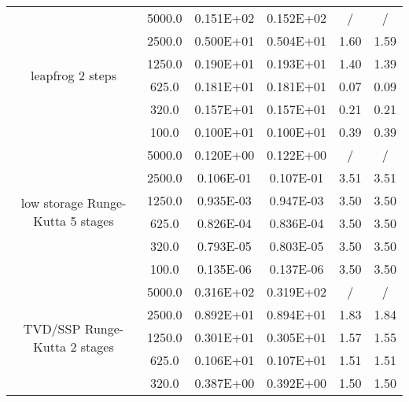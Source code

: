 \documentclass[pdftex,preprint,3p,times,numbers]{elsarticle}
\begin{document}
\begin{table}[!ht]
{\begin{tabular}{cccccc}
    \cmidrule{2-6}
    \multirow{6}{*}{leapfrog 2 steps}
                 &   5000.0        &  0.151E+02    &  0.152E+02    & /             & /             \\
                 &   2500.0        &  0.500E+01    &  0.504E+01    & 1.60          & 1.59          \\
                 &   1250.0        &  0.190E+01    &  0.193E+01    & 1.40          & 1.39          \\
                 &    625.0        &  0.181E+01    &  0.181E+01    & 0.07          & 0.09          \\
                 &    320.0        &  0.157E+01    &  0.157E+01    & 0.21          & 0.21          \\
                 &    100.0        &  0.100E+01    &  0.100E+01    & 0.39          & 0.39          \\
    \cmidrule{2-6}
    \multirow{6}{*}{low storage Runge-Kutta 5 stages}
                 &   5000.0        &  0.120E+00    &  0.122E+00    & /             & /             \\
                 &   2500.0        &  0.106E-01    &  0.107E-01    & 3.51          & 3.51          \\
                 &   1250.0        &  0.935E-03    &  0.947E-03    & 3.50          & 3.50          \\
                 &    625.0        &  0.826E-04    &  0.836E-04    & 3.50          & 3.50          \\
                 &    320.0        &  0.793E-05    &  0.803E-05    & 3.50          & 3.50          \\
                 &    100.0        &  0.135E-06    &  0.137E-06    & 3.50          & 3.50          \\
    \cmidrule{2-6}
    \multirow{6}{*}{TVD/SSP Runge-Kutta 2 stages}
                 &   5000.0        &  0.316E+02    &  0.319E+02    & /             & /             \\
                 &   2500.0        &  0.892E+01    &  0.894E+01    & 1.83          & 1.84          \\
                 &   1250.0        &  0.301E+01    &  0.305E+01    & 1.57          & 1.55          \\
                 &    625.0        &  0.106E+01    &  0.107E+01    & 1.51          & 1.51          \\
                 &    320.0        &  0.387E+00    &  0.392E+00    & 1.50          & 1.50          \\

\end{tabular}}
\end{table}
\end{document}
